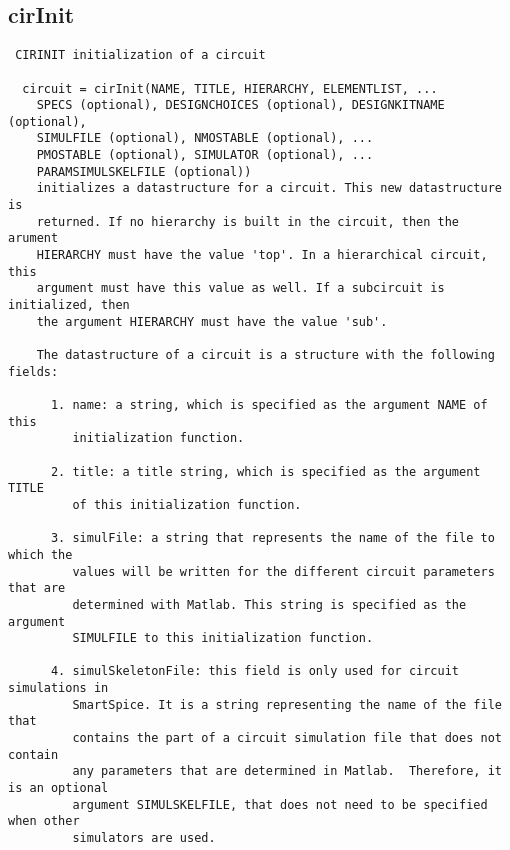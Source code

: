 \subsection{cirInit}
\label{sec:cirInit}
\begin{verbatim}
 CIRINIT initialization of a circuit
 
  circuit = cirInit(NAME, TITLE, HIERARCHY, ELEMENTLIST, ...
    SPECS (optional), DESIGNCHOICES (optional), DESIGNKITNAME (optional),
    SIMULFILE (optional), NMOSTABLE (optional), ... 
    PMOSTABLE (optional), SIMULATOR (optional), ...
    PARAMSIMULSKELFILE (optional)) 
    initializes a datastructure for a circuit. This new datastructure is
    returned. If no hierarchy is built in the circuit, then the arument
    HIERARCHY must have the value 'top'. In a hierarchical circuit, this
    argument must have this value as well. If a subcircuit is initialized, then
    the argument HIERARCHY must have the value 'sub'.
 
    The datastructure of a circuit is a structure with the following fields:
 
      1. name: a string, which is specified as the argument NAME of this
         initialization function.
      
      2. title: a title string, which is specified as the argument TITLE 
         of this initialization function.
 
      3. simulFile: a string that represents the name of the file to which the
         values will be written for the different circuit parameters that are
         determined with Matlab. This string is specified as the argument
         SIMULFILE to this initialization function.
 
      4. simulSkeletonFile: this field is only used for circuit simulations in 
         SmartSpice. It is a string representing the name of the file that
         contains the part of a circuit simulation file that does not contain
         any parameters that are determined in Matlab.  Therefore, it is an optional
         argument SIMULSKELFILE, that does not need to be specified when other 
         simulators are used. 
      

\end{verbatim}
